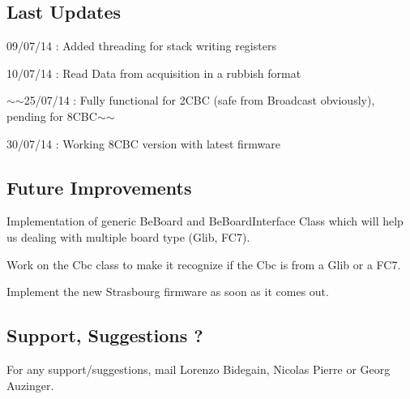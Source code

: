 \subsection*{Last Updates }


\begin{DoxyItemize}
\item 09/07/14 \-: Added threading for stack writing registers
\item 10/07/14 \-: Read Data from acquisition in a rubbish format
\item $\sim$$\sim$25/07/14 \-: Fully functional for 2\-C\-B\-C (safe from Broadcast obviously), pending for 8\-C\-B\-C$\sim$$\sim$
\item 30/07/14 \-: Working 8\-C\-B\-C version with latest firmware
\end{DoxyItemize}

\subsection*{Future Improvements }


\begin{DoxyItemize}
\item Implementation of generic Be\-Board and Be\-Board\-Interface Class which will help us dealing with multiple board type (Glib, F\-C7).
\item Work on the Cbc class to make it recognize if the Cbc is from a Glib or a F\-C7.
\item Implement the new Strasbourg firmware as soon as it comes out.
\end{DoxyItemize}

\subsection*{Support, Suggestions ? }

For any support/suggestions, mail Lorenzo Bidegain, Nicolas Pierre or Georg Auzinger. 
